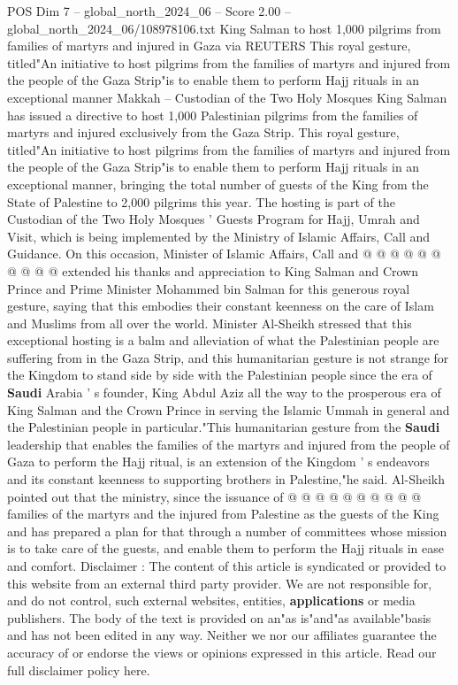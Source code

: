 \begin{textsample}{POS Dim 7 – global\_north\_2024\_06 – Score 2.00 – global\_north\_2024\_06/108978106.txt}  \label{ex:f7_pos_318}
King Salman to host 1,000 pilgrims from families of martyrs and injured in Gaza via REUTERS This royal gesture, titled"An initiative to host pilgrims from the families of martyrs and injured from the people of the Gaza Strip"is to enable them to perform Hajj rituals in an exceptional manner Makkah -- Custodian of the Two Holy Mosques King Salman has issued a directive to host 1,000 Palestinian pilgrims from the families of martyrs and injured exclusively from the Gaza Strip.
This royal gesture, titled"An initiative to host pilgrims from the families of martyrs and injured from the people of the Gaza Strip"is to enable them to perform Hajj rituals in an exceptional manner, bringing the total number of guests of the King from the State of Palestine to 2,000 pilgrims this year.
The hosting is part of the Custodian of the Two Holy Mosques ' Guests Program for Hajj, Umrah and Visit, which is being implemented by the Ministry of Islamic Affairs, Call and Guidance.
On this occasion, Minister of Islamic Affairs, Call and @ @ @ @ @ @ @ @ @ @ extended his thanks and appreciation to King Salman and Crown Prince and Prime Minister Mohammed bin Salman for this generous royal gesture, saying that this embodies their constant keenness on the care of Islam and Muslims from all over the world.
Minister Al-Sheikh stressed that this exceptional hosting is a balm and alleviation of what the Palestinian people are suffering from in the Gaza Strip, and this humanitarian gesture is not strange for the Kingdom to stand side by side with the Palestinian people since the era of \textbf{Saudi} Arabia ' s founder, King Abdul Aziz all the way to the prosperous era of King Salman and the Crown Prince in serving the Islamic Ummah in general and the Palestinian people in particular."This humanitarian gesture from the \textbf{Saudi} leadership that enables the families of the martyrs and injured from the people of Gaza to perform the Hajj ritual, is an extension of the Kingdom ' s endeavors and its constant keenness to supporting brothers in Palestine,"he said.
Al-Sheikh pointed out that the ministry, since the issuance of @ @ @ @ @ @ @ @ @ @ families of the martyrs and the injured from Palestine as the guests of the King and has prepared a plan for that through a number of committees whose mission is to take care of the guests, and enable them to perform the Hajj rituals in ease and comfort.
Disclaimer : The content of this article is syndicated or provided to this website from an external third party provider.
We are not responsible for, and do not control, such external websites, entities, \textbf{applications} or media publishers.
The body of the text is provided on an"as is"and"as available"basis and has not been edited in any way.
Neither we nor our affiliates guarantee the accuracy of or endorse the views or opinions expressed in this article.
Read our full disclaimer policy here.

\end{textsample}
